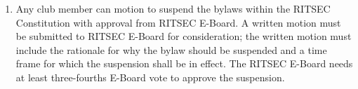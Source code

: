 

\begin{enumerate}
  \item Any club member can motion to suspend the bylaws within the RITSEC
    Constitution with approval from RITSEC E-Board. A written motion must be
    submitted to RITSEC E-Board for consideration; the written motion must include the
    rationale for why the bylaw should be suspended and a time frame for which
    the suspension shall be in effect. The RITSEC E-Board needs at least
    three-fourths E-Board vote to approve the suspension.
\end{enumerate}
